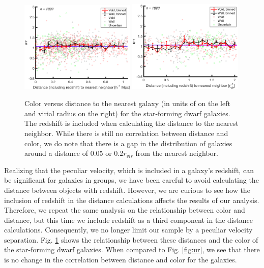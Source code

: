 \begin{figure}
    \includegraphics[width=0.49\textwidth]{Images/smallScaleEnvironment/1sig_dwarf_I06relations_zAbsDist_ur}
    \includegraphics[width=0.49\textwidth]{Images/smallScaleEnvironment/1sig_dwarf_I06relations_zVirDist_ur}
    \caption[Color versus distance calculated with redshift]{Color versus 
    distance to the nearest galaxy (in units of \hMpc on the left and virial 
    radius on the right) for the star-forming dwarf galaxies.  The redshift is 
    included when calculating the distance to the nearest neighbor.  While there 
    is still no correlation between distance and color, we do note that there is 
    a gap in the distribution of galaxies around a distance of 0.05 \hMpc or 
    0.2$r_{vir}$ from the nearest neighbor.}
    \label{fig:ur_xyz}
\end{figure}

Realizing that the peculiar velocity, which is included in a galaxy's redshift, 
can be significant for galaxies in groups, we have been careful to avoid 
calculating the distance between objects with redshift.  However, we are curious 
to see how the inclusion of redshift in the distance calculations affects the 
results of our analysis.  Therefore, we repeat the same analysis on the 
relationship between color and distance, but this time we include redshift as a 
third component in the distance calculations.  Consequently, we no longer limit 
our sample by a peculiar velocity separation.  Fig. \ref{fig:ur_xyz} shows the 
relationship between these distances and the color of the star-forming dwarf 
galaxies.  When compared to Fig. \ref{fig:ur}, we see that there is no change in 
the correlation between distance and color for the galaxies.  

